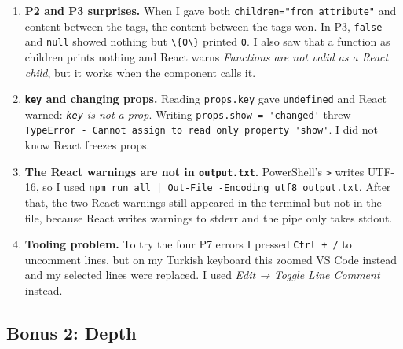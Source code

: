 \documentclass[
  10pt,
]{article}
\newcommand{\passthrough}[1]{#1}
\begin{document}
\begin{enumerate}
  \passthrough{\lstinline!function showLabel(\{ name: string, seasons: number \})!}
  gave three errors:
  \passthrough{\lstinline!TS7031: Binding element 'string' implicitly has an 'any' type!}
  (twice) and
  \passthrough{\lstinline!TS2304: Cannot find name 'seasons'!}. The
  surprise was that \passthrough{\lstinline!name!} gave \textbf{no}
  error, even though it was renamed too. The reason: TypeScript knows
  the browser global \passthrough{\lstinline!name!}
  (\passthrough{\lstinline!window.name!}), so
  \passthrough{\lstinline!$\{name\}!} silently used that global instead.
  So this mistake can be hidden, not only loud.
\item
  \textbf{P2 and P3 surprises.} When I gave both
  \passthrough{\lstinline!children="from attribute"!} and content
  between the tags, the content between the tags won. In P3,
  \passthrough{\lstinline!false!} and \passthrough{\lstinline!null!}
  showed nothing but \passthrough{\lstinline!\{0\}!} printed
  \passthrough{\lstinline!0!}. I also saw that a function as children
  prints nothing and React warns \emph{Functions are not valid as a
  React child}, but it works when the component calls it.
\item
  \textbf{\passthrough{\lstinline!key!} and changing props.} Reading
  \passthrough{\lstinline!props.key!} gave
  \passthrough{\lstinline!undefined!} and React warned:
  \emph{\passthrough{\lstinline!key!} is not a prop}. Writing
  \passthrough{\lstinline!props.show = 'changed'!} threw
  \passthrough{\lstinline!TypeError - Cannot assign to read only property 'show'!}.
  I did not know React freezes props.
\item
  \textbf{The React warnings are not in
  \passthrough{\lstinline!output.txt!}.} PowerShell's
  \passthrough{\lstinline!>!} writes UTF-16, so I used
  \passthrough{\lstinline!npm run all | Out-File -Encoding utf8 output.txt!}.
  After that, the two React warnings still appeared in the terminal but
  not in the file, because React writes warnings to stderr and the pipe
  only takes stdout.
\item
  \textbf{Tooling problem.} To try the four P7 errors I pressed
  \passthrough{\lstinline!Ctrl + /!} to uncomment lines, but on my
  Turkish keyboard this zoomed VS Code instead and my selected lines
  were replaced. I used \emph{Edit → Toggle Line Comment} instead.
\end{enumerate}

\hypertarget{bonus-2-depth}{%
\subsection{Bonus 2: Depth}\label{bonus-2-depth}}
\end{document}
